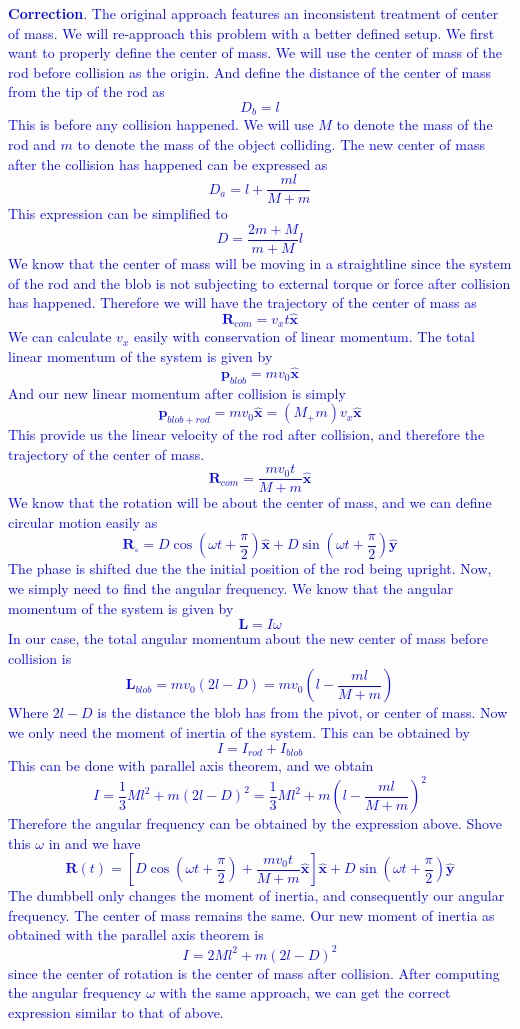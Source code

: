\documentclass[12pt]{article}
\newcommand{\sqbkt}[1]{\left[ #1 \right]}
\newcommand{\paren}[1]{\left( #1 \right)}
\newcommand{\unx}{\hat{\mathbf{x}}}
\newcommand{\uny}{\hat{\mathbf{y}}}
\begin{document}
\textcolor{blue}{\textbf{Correction}.  The original approach features an inconsistent treatment of center of mass. We will re-approach this problem with a better defined setup. We first want to properly define the center of mass. We will use the center of mass of the rod before collision as the origin. And define the distance of the center of mass from the tip of the rod as
\[
D_b = l
\]
This is before any collision happened. We will use $M$ to denote the mass of the rod and $m$ to denote the mass of the object colliding. The new center of mass after the collision has happened can be expressed as
\[
D_a = l + \frac{ml}{M+m}
\]
This expression can be simplified to
\[
D = \frac{2m+M}{m+M}l
\]
We know that the center of mass will be moving in a straightline since the system of the rod and the blob is not subjecting to external torque or force after collision has happened. Therefore we will have the trajectory of the center of mass as
\[
\mathbf{R}_{com} = v_xt\unx
\]
We can calculate $v_x$ easily with conservation of linear momentum. The total linear momentum of the system is given by
\[
\mathbf{p}_{blob} = mv_0\unx
\]
And our new linear momentum after collision is simply
\[
\mathbf{p}_{blob+rod} = mv_0\unx = (M_+m)v_x\unx
\]
This provide us the linear velocity of the rod after collision, and therefore the trajectory of the center of mass.
\[
\mathbf{R}_{com} = \frac{mv_0t}{M+m}\unx
\]
We know that the rotation will be about the center of mass, and we can define circular motion easily as
\[
\mathbf{R}_{\circ} = D\cos\paren{\omega t + \frac{\pi}{2}}\unx + D\sin\paren{\omega t + \frac{\pi}{2}}\uny
\]
The phase is shifted due the the initial position of the rod being upright. Now, we simply need to find the angular frequency. We know that the angular momentum of the system is given by
\[
\mathbf{L} = I\omega
\]
In our case, the total angular momentum about the new center of mass before collision is
\[
\mathbf{L}_{blob} = mv_0(2l-D) = mv_0\paren{l - \frac{ml}{M+m}}
\]
Where $2l-D$ is the distance the blob has from the pivot, or center of mass. Now we only need the moment of inertia of the system. This can be obtained by
\[
I = I_{rod} + I_{blob}
\]
This can be done with parallel axis theorem, and we obtain
\[
I = \frac{1}{3}Ml^2 + m(2l-D)^2 = \frac{1}{3}Ml^2  + m\paren{l - \frac{ml}{M+m}}^2
\]
Therefore the angular frequency can be obtained by the expression above. Shove this $\omega$ in and we have
\[
\mathbf{R}(t) = \sqbkt{D\cos\paren{\omega t + \frac{\pi}{2}} + \frac{mv_0t}{M+m}\unx}\unx + D\sin\paren{\omega t + \frac{\pi}{2}}\uny
\]
The dumbbell only changes the moment of inertia, and consequently our angular frequency. The center of mass remains the same. Our new moment of inertia as obtained with the parallel axis theorem is
\[
I = 2Ml^2 + m(2l-D)^2
\]
since the center of rotation is the center of mass after collision. After computing the angular frequency $\omega$ with the same approach, we can get the correct expression similar to that of above. 
}
\end{document}
